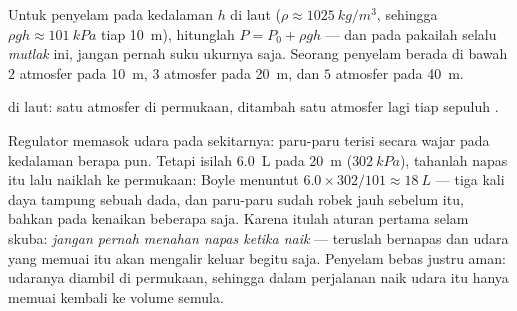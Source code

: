 \begin{method}\label{met:g10:pressure:dive}
Untuk penyelam pada kedalaman $h$ di laut ($\rho \approx \qty{1025}{kg/m^3}$, sehingga $\rho g h \approx \qty{101}{kPa}$ tiap
\qty{10}{m}), hitunglah $P = P_0 + \rho g h$ --- dan pada 
pakailah selalu  \emph{mutlak} ini, jangan
pernah suku ukurnya saja. Seorang penyelam berada di bawah $2$ atmosfer
pada \qty{10}{m}, $3$ atmosfer pada \qty{20}{m}, dan $5$ atmosfer pada
\qty{40}{m}.
\end{method}

\begin{omfigure}

{\small {} di laut: satu atmosfer di permukaan, ditambah satu atmosfer lagi tiap sepuluh .}
\end{omfigure}

\begin{remark}\label{rem:g10:pressure:breath}
Regulator memasok udara pada  sekitarnya: paru-paru terisi secara
wajar pada kedalaman berapa pun. Tetapi isilah \qty{6.0}{L} pada
\qty{20}{m} ($\qty{302}{kPa}$), tahanlah napas itu lalu naiklah ke
permukaan: Boyle menuntut $6.0 \times 302/101 \approx \qty{18}{L}$ ---
tiga kali daya tampung sebuah dada, dan paru-paru sudah robek jauh
sebelum itu, bahkan pada kenaikan beberapa  saja. Karena itulah
aturan pertama selam skuba: \emph{jangan pernah menahan napas ketika
naik} --- teruslah bernapas dan udara yang memuai itu akan mengalir
keluar begitu saja. Penyelam bebas justru aman: udaranya diambil di
permukaan, sehingga dalam perjalanan naik udara itu hanya memuai
kembali ke volume semula.
\end{remark}

